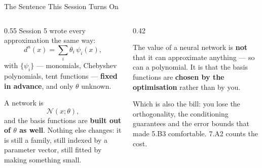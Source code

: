 \begin{frame}{The Sentence This Session Turns On}
\begin{columns}[T]
\begin{column}{0.55\textwidth}
\small
Session 5 wrote every approximation the same way:
\[
  d^{n}(x)=\sum_{i}\theta_i\,\psi_i(x),
\]
with $\{\psi_i\}$ --- monomials, Chebyshev polynomials, tent functions --- \textbf{fixed in advance}, and only $\theta$ unknown.
\medskip

A network is
\[
  \mathcal{N}(x;\theta),
\]
and the basis functions are \textbf{built out of $\theta$ as well}. Nothing else changes: it is still a family, still indexed by a parameter vector, still fitted by making something small.
\end{column}
\begin{column}{0.42\textwidth}
\begin{takeawaybox}[title=\textbf{The claim, precisely}]\small
The value of a neural network is \textbf{not} that it can approximate anything --- so can a polynomial.
\medskip
It is that the basis functions are \textbf{chosen by the optimisation} rather than by you.
\end{takeawaybox}
\medskip
\begin{cautionbox}\footnotesize
Which is also the bill: you lose the orthogonality, the conditioning guarantees and the error bounds that made 5.B3 comfortable. 7.A2 counts the cost.
\end{cautionbox}
\end{column}
\end{columns}
\vspace{1mm}
\end{frame}

